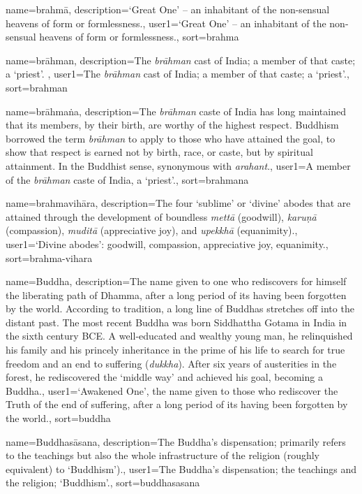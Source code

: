{
name={brahm\=a},
description={`Great One' -- an inhabitant of the non-sensual heavens of form or formlessness.},
user1={`Great One' -- an inhabitant of the non-sensual heavens of form or formlessness.},
sort={brahma}
}

{
name=br\=ahman,
description={The \textit{br\=ahman} cast of India; a member of that caste; a `priest'. \protect \seepre %
\protect {}%
\protect \seepost %
},
user1={The \textit{br\=ahman} cast of India; a member of that caste; a `priest'.},
sort={brahman}
}

{
name={br\=ahma\.na},
description={The \textit{br\=ahman} caste of India has long maintained that its members, by their birth, are worthy of the highest respect. Buddhism borrowed the term \textit{br\=ahman} to apply to those who have attained the goal, to show that respect is earned not by birth, race, or caste, but by spiritual attainment. In the Buddhist sense, synonymous with \textit{arahant}.},
user1={A member of the \textit{br\=ahman} caste of India, a `priest'.},
sort={brahmana}
}

{
name={brahmavih\=ara},
description={The four `sublime' or `divine' abodes that are attained through the development of boundless \textit{mett\=a} (goodwill), \textit{karu\d{n}\=a} (compassion), \textit{mudit\=a} (appreciative joy), and \textit{upekkh\=a} (equanimity).},
user1={`Divine abodes': goodwill, compassion, appreciative joy, equanimity.},
sort={brahma-vihara}
}

{
name=Buddha,
description={The name given to one who rediscovers for himself the liberating path of Dhamma, after a long period of its having been forgotten by the world. According to tradition, a long line of Buddhas stretches off into the distant past. The most recent Buddha was born Siddhattha Gotama in India in the sixth century BCE. A well-educated and wealthy young man, he relinquished his family and his princely inheritance in the prime of his life to search for true freedom and an end to suffering (\textit{dukkha}). After six years of austerities in the forest, he rediscovered the `middle way' and achieved his goal, becoming a Buddha.},
user1={`Awakened One', the name given to those who rediscover the Truth of the end of suffering, after a long period of its having been forgotten by the world.},
sort={buddha}
}

{
name=Buddhas\=asana,
description={The Buddha's dispensation; primarily refers to the teachings but also the whole infrastructure of the religion (roughly equivalent) to `Buddhism').},
user1={The Buddha's dispensation; the teachings and the religion; `Buddhism'.},
sort={buddhasasana}
}

